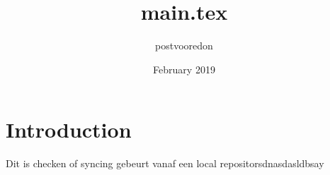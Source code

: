 \documentclass{article}
\title{main.tex}
\author{postvooredon }
\date{February 2019}
\begin{document}
\maketitle
\section{Introduction}
Dit is checken of syncing gebeurt vanaf een local repositorsdnasdasldbsay
\end{document}
